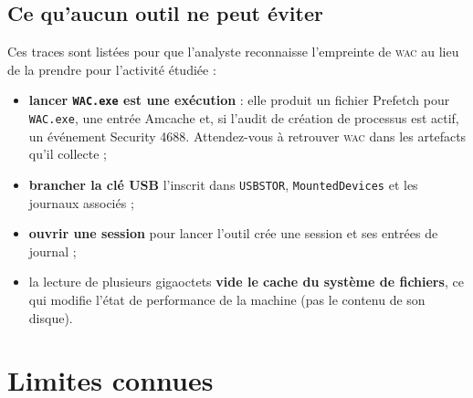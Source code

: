 \documentclass[11pt,a4paper,oneside]{report}
\newcommand{\wac}{\textsc{wac}}
\newcommand{\fichier}[1]{\texttt{#1}}
\begin{document}
\section{Ce qu'aucun outil ne peut éviter}

Ces traces sont listées pour que l'analyste reconnaisse l'empreinte de \wac{} au
lieu de la prendre pour l'activité étudiée :

\begin{itemize}
  \item \textbf{lancer \fichier{WAC.exe} est une exécution} : elle produit un
        fichier Prefetch pour \fichier{WAC.exe}, une entrée Amcache et, si
        l'audit de création de processus est actif, un événement Security 4688.
        Attendez-vous à retrouver \wac{} dans les artefacts qu'il collecte ;
  \item \textbf{brancher la clé USB} l'inscrit dans \fichier{USBSTOR},
        \fichier{MountedDevices} et les journaux associés ;
  \item \textbf{ouvrir une session} pour lancer l'outil crée une session et ses
        entrées de journal ;
  \item la lecture de plusieurs gigaoctets \textbf{vide le cache du système de
        fichiers}, ce qui modifie l'état de performance de la machine (pas le
        contenu de son disque).
\end{itemize}

\chapter{Limites connues}
\end{document}
